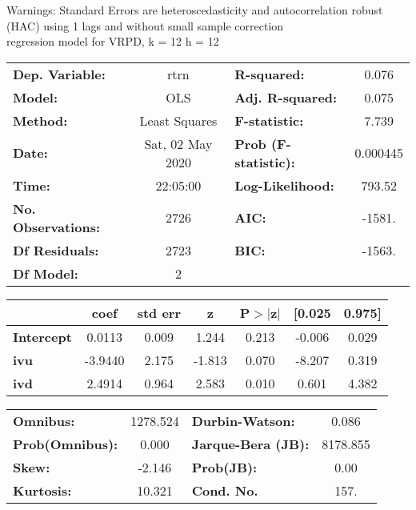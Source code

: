 Warnings: \newline
 [1] Standard Errors are heteroscedasticity and autocorrelation robust (HAC) using 1 lags and without small sample correction\\ 

regression model for VRPD, k = 12 h = 12\begin{center}
\begin{tabular}{lclc}
\toprule
\textbf{Dep. Variable:}    &       rtrn       & \textbf{  R-squared:         } &     0.076   \\
\textbf{Model:}            &       OLS        & \textbf{  Adj. R-squared:    } &     0.075   \\
\textbf{Method:}           &  Least Squares   & \textbf{  F-statistic:       } &     7.739   \\
\textbf{Date:}             & Sat, 02 May 2020 & \textbf{  Prob (F-statistic):} &  0.000445   \\
\textbf{Time:}             &     22:05:00     & \textbf{  Log-Likelihood:    } &    793.52   \\
\textbf{No. Observations:} &        2726      & \textbf{  AIC:               } &    -1581.   \\
\textbf{Df Residuals:}     &        2723      & \textbf{  BIC:               } &    -1563.   \\
\textbf{Df Model:}         &           2      & \textbf{                     } &             \\
\bottomrule
\end{tabular}
\begin{tabular}{lcccccc}
                   & \textbf{coef} & \textbf{std err} & \textbf{z} & \textbf{P$> |$z$|$} & \textbf{[0.025} & \textbf{0.975]}  \\
\midrule
\textbf{Intercept} &       0.0113  &        0.009     &     1.244  &         0.213        &       -0.006    &        0.029     \\
\textbf{ivu}       &      -3.9440  &        2.175     &    -1.813  &         0.070        &       -8.207    &        0.319     \\
\textbf{ivd}       &       2.4914  &        0.964     &     2.583  &         0.010        &        0.601    &        4.382     \\
\bottomrule
\end{tabular}
\begin{tabular}{lclc}
\textbf{Omnibus:}       & 1278.524 & \textbf{  Durbin-Watson:     } &    0.086  \\
\textbf{Prob(Omnibus):} &   0.000  & \textbf{  Jarque-Bera (JB):  } & 8178.855  \\
\textbf{Skew:}          &  -2.146  & \textbf{  Prob(JB):          } &     0.00  \\
\textbf{Kurtosis:}      &  10.321  & \textbf{  Cond. No.          } &     157.  \\
\bottomrule
\end{tabular}
\end{center}

